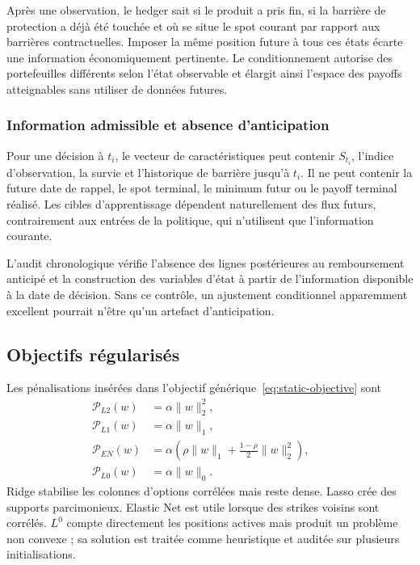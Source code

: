 \documentclass[12pt,a4paper]{article}
\newcommand{\1}{\mathbf{1}}
\begin{document}
Après une observation, le hedger sait si le produit a pris fin, si la barrière
de protection a déjà été touchée et où se situe le spot courant par rapport aux
barrières contractuelles. Imposer la même position future à tous ces états écarte
une information économiquement pertinente. Le conditionnement autorise des
portefeuilles différents selon l'état observable et élargit ainsi l'espace des
payoffs atteignables sans utiliser de données futures.

\subsubsection*{Information admissible et absence d'anticipation}

Pour une décision à $t_i$, le vecteur de caractéristiques peut contenir $S_{t_i}$,
l'indice d'observation, la survie et l'historique de barrière jusqu'à $t_i$. Il ne
peut contenir la future date de rappel, le spot terminal, le minimum futur ou le
payoff terminal réalisé. Les cibles d'apprentissage dépendent naturellement des
flux futurs, contrairement aux entrées de la politique, qui n'utilisent que
l'information courante.

L'audit chronologique vérifie l'absence des lignes postérieures au remboursement
anticipé et la construction des variables d'état à partir de l'information
disponible à la date de décision. Sans ce contrôle, un ajustement conditionnel
apparemment excellent pourrait n'être qu'un artefact d'anticipation.

\subsection{Objectifs régularisés}

Les pénalisations insérées dans l'objectif générique~\eqref{eq:static-objective} sont
\begin{align}
 \mathcal P_{L2}(w)&=\alpha\lVert w\rVert_2^2,
 &&\label{eq:ridge-penalty}\\
 \mathcal P_{L1}(w)&=\alpha\lVert w\rVert_1,
 &&\label{eq:lasso-penalty}\\
 \mathcal P_{EN}(w)&=\alpha\left(\rho\lVert w\rVert_1+\frac{1-\rho}{2}\lVert w\rVert_2^2\right),
 &&\label{eq:elastic-net-penalty}\\
 \mathcal P_{L0}(w)&=\alpha\lVert w\rVert_0.
 &&\label{eq:l0-penalty}
\end{align}
Ridge stabilise les colonnes d'options corrélées mais reste dense. Lasso crée des supports parcimonieux. Elastic Net est utile lorsque des strikes voisins sont corrélés. $L^0$ compte directement les positions actives mais produit un problème non convexe ; sa solution est traitée comme heuristique et auditée sur plusieurs initialisations.
\end{document}
